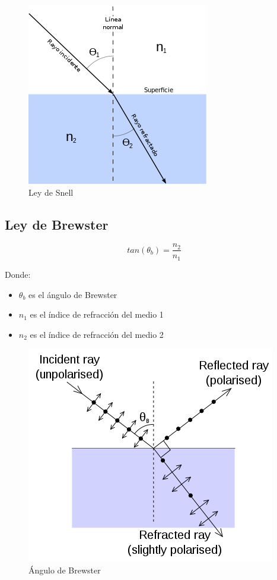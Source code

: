 \documentclass[]{article}
\begin{document}
\begin{figure}[H]
	\centering
	\includegraphics[scale=0.5]{Imagenes/Snell}
	\caption{Ley de Snell}
	\label{fig:Snell}
\end{figure}

\subsection{Ley de Brewster}

\begin{equation}
tan(\theta_b)=\frac{n_2}{n_1}
\end{equation}

Donde:\\

\begin{itemize}
	\item $\theta_b$ es el ángulo de Brewster
	\item $n_1$ es el índice de refracción del medio 1
	\item $n_2$ es el índice de refracción del medio 2
\end{itemize}

\begin{figure}[H]
	\centering
	\includegraphics[scale=0.5]{Imagenes/Brewster}
	\caption{Ángulo de Brewster}
	\label{fig:Brewster}
\end{figure}
\end{document}
